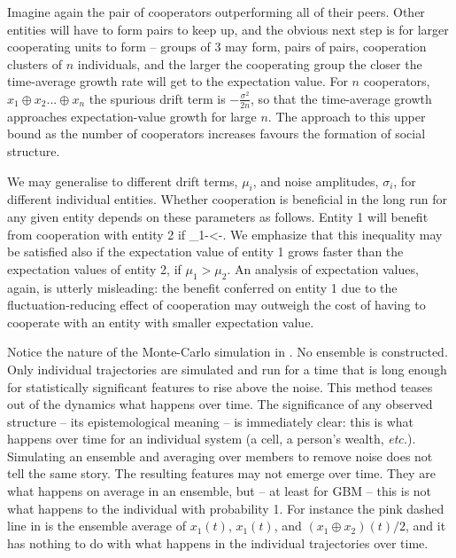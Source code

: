 Imagine again the pair of cooperators outperforming all of their peers. Other
entities will have to form pairs to keep up, and the obvious next step is for larger
cooperating units to form -- groups of 3 may form, pairs of pairs, cooperation 
clusters of $n$ individuals, and the larger the cooperating group the closer the
time-average growth rate will get to the expectation value.
For $n$ cooperators, $x_1\oplus x_2 ... \oplus x_n$ the spurious drift term is 
$-\frac{\sigma^2}{2n}$, so that the time-average growth approaches 
expectation-value growth for large $n$. The approach to this upper bound as 
the number of cooperators increases favours the formation of social structure. 

We may generalise to different drift 
terms, $\mu_i$, and noise amplitudes, $\sigma_i$, for different individual entities. 
Whether cooperation is beneficial in the long run for any
given entity depends on these parameters as follows. Entity 1 
will benefit from cooperation with entity 2 if 
\be
\mu_1-<-.
\ee
We emphasize that this inequality may be satisfied also if the expectation value
of entity 1 grows faster than the expectation values of entity 2, \ie if
$\mu_1>\mu_2$. An analysis of expectation values, again, is utterly misleading:
the benefit conferred on entity 1 due to the fluctuation-reducing effect of 
cooperation may outweigh the cost of having to cooperate with an entity with
smaller expectation value.
 
Notice the nature of the Monte-Carlo simulation in . No ensemble
is constructed. Only individual trajectories are simulated and run for a time that is 
long enough for statistically significant features to rise above the noise. This method
teases out of the dynamics what happens over time. The significance of any observed 
structure -- its epistemological meaning -- is immediately clear: this is what happens over time
for an individual system (a cell, a person's wealth, {\it etc.}). Simulating an ensemble
and averaging over members to remove noise does not tell the same story. The resulting
features may not emerge over time. They are what happens on average in an ensemble, 
but -- at least for GBM -- this is not what happens to the individual with probability 1. For instance the 
 pink dashed line in  is the ensemble average of $x_1(t)$, $x_1(t)$, 
 and $(x_1 \oplus x_2)(t)/2$, and it has nothing to do with what happens 
 in the individual trajectories over time.

